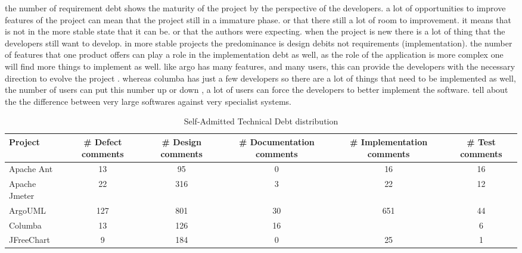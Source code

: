 the number of requirement debt shows the maturity of the project by the perspective of the developers. a lot of opportunities to improve features of the project can mean that the project still in a immature phase. or that there still a lot of room to improvement. it means that is not in the more stable state that it can be. or that the authors were expecting. when the project is new there is a lot of thing that the developers still want to develop. in more stable projects the predominance is design debits not requirements (implementation). the number of features that one product offers can play a role in the implementation debt as well, as the role of the application is more complex one will find more things to implement as well. like argo has many features, and many users, this can provide the developers with the necessary direction to evolve the project . whereas columba has just a few developers so there are a lot of things that need to be implemented as well, the number of users can put this number up or down , a lot of users can force the developers to better implement the software. tell about the the difference between very large softwares against very specialist systems. 




\begin{table*}[!hbt]
      \begin{center}
            \caption{Self-Admitted Technical Debt distribution}
            \label{tab:td_distribution}
            \begin{tabular}{l| c c c c c}
            \toprule
            \textbf{Project}   & \textbf{\# Defect comments}  & \textbf{\# Design comments} & \textbf{\# Documentation comments} & \textbf{\# Implementation comments} & \textbf{\# Test comments}\\ \midrule 
             Apache Ant          &  13& 95& 0& 16& 16\\
             Apache Jmeter       &  22& 316& 3& 22& 12\\
             ArgoUML             &  127& 801& 30& 651& 44\\
             Columba             &  13& 126& 16& & 6\\
             JFreeChart          &  9& 184& 0& 25& 1\\ \bottomrule                                             
            \end{tabular}
      \end{center}
\end{table*}

